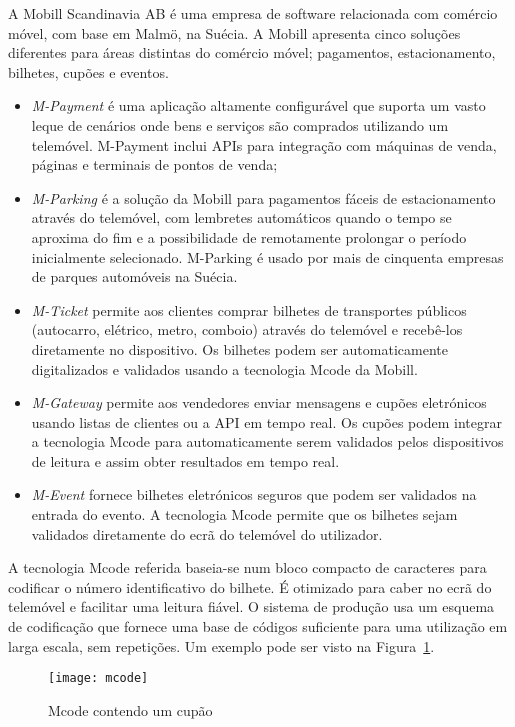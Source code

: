 A Mobill Scandinavia AB é uma empresa de software relacionada com comércio móvel, com base em Malmö, na Suécia. A Mobill apresenta cinco soluções diferentes para áreas distintas do comércio móvel; pagamentos,  estacionamento, bilhetes, cupões e eventos.\cite{mobill}
\begin{itemize}
\item \emph{M-Payment} é uma aplicação altamente configurável que suporta um vasto leque de cenários onde bens e serviços são comprados utilizando um telemóvel. M-Payment inclui APIs para integração com máquinas de venda, páginas \web e terminais de pontos de venda;
\item \emph{M-Parking} é a solução da Mobill para pagamentos fáceis de estacionamento através do telemóvel, com lembretes automáticos quando o tempo se aproxima do fim e a possibilidade de remotamente prolongar o período inicialmente selecionado. M-Parking é usado por mais de cinquenta empresas de parques automóveis na Suécia.
\item \emph{M-Ticket} permite aos clientes comprar bilhetes de transportes públicos (autocarro, elétrico, metro, comboio) através do telemóvel e recebê-los diretamente no dispositivo. Os bilhetes podem ser automaticamente digitalizados e validados usando a tecnologia Mcode da Mobill.
\item \emph{M-Gateway} permite aos vendedores enviar mensagens e cupões eletrónicos usando listas de clientes ou a API em tempo real. Os cupões podem integrar a tecnologia Mcode para automaticamente serem validados pelos dispositivos de leitura e assim obter resultados em tempo real.
\item \emph{M-Event} fornece bilhetes eletrónicos seguros que podem ser validados na entrada do evento. A tecnologia Mcode permite que os bilhetes sejam validados diretamente do ecrã do telemóvel do utilizador.
\end{itemize}
A tecnologia Mcode referida baseia-se num bloco compacto de caracteres para codificar o número identificativo do bilhete. É otimizado para caber no ecrã do telemóvel e facilitar uma leitura fiável. O sistema de produção usa um esquema de codificação que fornece uma base de códigos suficiente para uma utilização em larga escala, sem repetições. Um exemplo pode ser visto na Figura~\ref{fig:mcode}.

\begin{figure}[t]
  \begin{center}
    \leavevmode
    \texttt{[image: mcode]}
    \caption{Mcode contendo um cupão}
    \label{fig:mcode}
  \end{center}
\end{figure}

